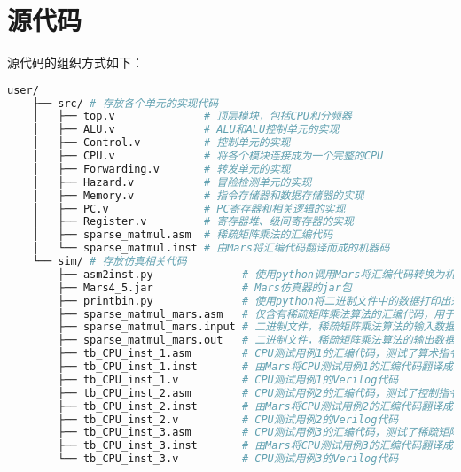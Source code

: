 \section{源代码}
源代码的组织方式如下：
\begin{lstlisting}[language={bash}, numbers=none]
    user/
    ├── src/ # 存放各个单元的实现代码
    │   ├── top.v              # 顶层模块，包括CPU和分频器
    │   ├── ALU.v              # ALU和ALU控制单元的实现
    │   ├── Control.v          # 控制单元的实现
    │   ├── CPU.v              # 将各个模块连接成为一个完整的CPU
    │   ├── Forwarding.v       # 转发单元的实现
    │   ├── Hazard.v           # 冒险检测单元的实现
    │   ├── Memory.v           # 指令存储器和数据存储器的实现
    │   ├── PC.v               # PC寄存器和相关逻辑的实现
    │   ├── Register.v         # 寄存器堆、级间寄存器的实现
    │   ├── sparse_matmul.asm  # 稀疏矩阵乘法的汇编代码
    │   └── sparse_matmul.inst # 由Mars将汇编代码翻译而成的机器码
    └── sim/ # 存放仿真相关代码
        ├── asm2inst.py              # 使用python调用Mars将汇编代码转换为机器码
        ├── Mars4_5.jar              # Mars仿真器的jar包
        ├── printbin.py              # 使用python将二进制文件中的数据打印出来
        ├── sparse_matmul_mars.asm   # 仅含有稀疏矩阵乘法算法的汇编代码，用于统计指令数
        ├── sparse_matmul_mars.input # 二进制文件，稀疏矩阵乘法算法的输入数据
        ├── sparse_matmul_mars.out   # 二进制文件，稀疏矩阵乘法算法的输出数据
        ├── tb_CPU_inst_1.asm        # CPU测试用例1的汇编代码，测试了算术指令和转发
        ├── tb_CPU_inst_1.inst       # 由Mars将CPU测试用例1的汇编代码翻译成的机器码
        ├── tb_CPU_inst_1.v          # CPU测试用例1的Verilog代码
        ├── tb_CPU_inst_2.asm        # CPU测试用例2的汇编代码，测试了控制指令和冒险
        ├── tb_CPU_inst_2.inst       # 由Mars将CPU测试用例2的汇编代码翻译成的机器码
        ├── tb_CPU_inst_2.v          # CPU测试用例2的Verilog代码
        ├── tb_CPU_inst_3.asm        # CPU测试用例3的汇编代码，测试了稀疏矩阵乘法和BCD7显示
        ├── tb_CPU_inst_3.inst       # 由Mars将CPU测试用例3的汇编代码翻译成的机器码
        └── tb_CPU_inst_3.v          # CPU测试用例3的Verilog代码
\end{lstlisting}




